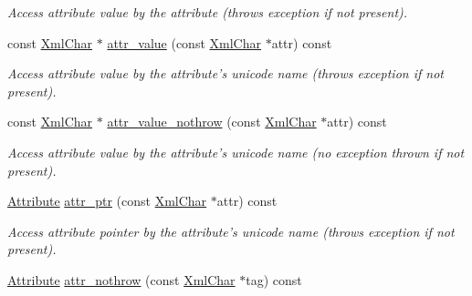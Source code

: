 \begin{DoxyCompactItemize}
\begin{DoxyCompactList}\small\item\em Access attribute value by the attribute (throws exception if not present). \item\end{DoxyCompactList}\item 
const \hyperlink{namespace_d_d4hep_1_1_x_m_l_a09e5d9cc86ed782f6826dfe0778c1815}{XmlChar} $\ast$ \hyperlink{class_d_d4hep_1_1_x_m_l_1_1_handle__t_a192be5b3194575830942910f8f671589}{attr\_\-value} (const \hyperlink{namespace_d_d4hep_1_1_x_m_l_a09e5d9cc86ed782f6826dfe0778c1815}{XmlChar} $\ast$attr) const 
\begin{DoxyCompactList}\small\item\em Access attribute value by the attribute's unicode name (throws exception if not present). \item\end{DoxyCompactList}\item 
const \hyperlink{namespace_d_d4hep_1_1_x_m_l_a09e5d9cc86ed782f6826dfe0778c1815}{XmlChar} $\ast$ \hyperlink{class_d_d4hep_1_1_x_m_l_1_1_handle__t_aa66d7cdd06c05c382eb9597eb4e06db2}{attr\_\-value\_\-nothrow} (const \hyperlink{namespace_d_d4hep_1_1_x_m_l_a09e5d9cc86ed782f6826dfe0778c1815}{XmlChar} $\ast$attr) const 
\begin{DoxyCompactList}\small\item\em Access attribute value by the attribute's unicode name (no exception thrown if not present). \item\end{DoxyCompactList}\item 
\hyperlink{namespace_d_d4hep_1_1_x_m_l_a5c19b7116be99d69b4b22d911357baaf}{Attribute} \hyperlink{class_d_d4hep_1_1_x_m_l_1_1_handle__t_abab559d23f0817f14d66172c641d6c50}{attr\_\-ptr} (const \hyperlink{namespace_d_d4hep_1_1_x_m_l_a09e5d9cc86ed782f6826dfe0778c1815}{XmlChar} $\ast$attr) const 
\begin{DoxyCompactList}\small\item\em Access attribute pointer by the attribute's unicode name (throws exception if not present). \item\end{DoxyCompactList}\item 
\hyperlink{namespace_d_d4hep_1_1_x_m_l_a5c19b7116be99d69b4b22d911357baaf}{Attribute} \hyperlink{class_d_d4hep_1_1_x_m_l_1_1_handle__t_a3975488eca8248e5ec37857107206ffd}{attr\_\-nothrow} (const \hyperlink{namespace_d_d4hep_1_1_x_m_l_a09e5d9cc86ed782f6826dfe0778c1815}{XmlChar} $\ast$tag) const 

\end{DoxyCompactItemize}

